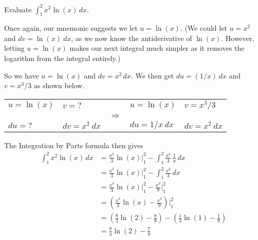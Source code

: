 \begin{example} \label{eg:5.1.5} %
Evaluate $\displaystyle \int_1^2 x^2 \ln(x) \,dx$.

\solution Once again, our mnemonic suggests we let $u=\ln(x)$.  (We could let $u = x^2$ and $dv = \ln(x)\ dx$, as we now know the antiderivative of $\ln(x)$. However, letting $u = \ln(x)$ makes our next integral much simpler as it removes the logarithm from the integral entirely.)

So we have $u=\ln(x)$ and $dv=x^2\,dx$.  We then get $du = (1/x)\,dx$ and $v=x^3/3$ as shown below.

\begin{tabular}{llcll} \\
$u= \ln(x)$ & $v=\text{?}$ & & $u= \ln(x)$ & $v=x^3/3$ \\
 && $\Rightarrow$ && \\
$du= \text{?}$ & $dv=x^2\ dx$ & &  $du= 1/x\ dx$ & $dv=x^2\ dx$ \\
\end{tabular}

The Integration by Parts formula then gives
\begin{align*}
\int_1^2 x^2 \ln(x)\,dx &= \frac{x^3}3\ln(x)\bigg|_1^2 - \int_1^2 \frac{x^3}{3}\,\frac 1x\,dx \\
				&=  \frac{x^3}3\ln(x)\bigg|_1^2 - \int_1^2 \frac{x^2}{3}\,dx \\
				&=  \frac{x^3}3\ln(x)\bigg|_1^2 - \frac{x^3}{9}\bigg|_1^2\\
				&=  \left(\frac{x^3}3\ln(x) - \frac{x^3}{9}\right)\bigg|_1^2\\
				&=	\left(\frac83\ln(2) - \frac89\right)-\left(\frac13\ln(1) - \frac19\right) \\
				&= \frac83\ln(2) - \frac79 
\end{align*}
\end{example}